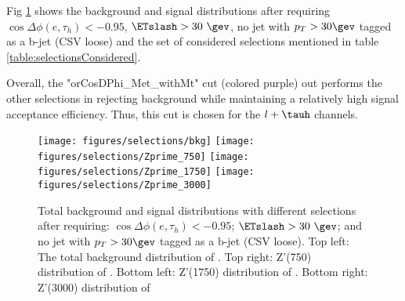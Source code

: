 Fig \ref{fig:selectionMotiviation2} shows the background and signal \meffmtau distributions 
after requiring $\cos{\Delta \phi (e,\tau_{h})}<-0.95$, $\ETslash>30~\gev$, no jet with 
$p_T>30\gev$ tagged as a b-jet (CSV loose) and the set of considered selections mentioned in 
table \ref{table:selectionsConsidered}. 

Overall, the "orCosDPhi\_Met\_withMt" cut (colored purple) out performs the other selections 
in rejecting background while maintaining a relatively high signal acceptance efficiency. 
Thus, this cut is chosen for the $l + \tauh$ channels.

\begin{figure}\centering
  \texttt{[image: figures/selections/bkg]}
  \texttt{[image: figures/selections/Zprime\_750]}
  \texttt{[image: figures/selections/Zprime\_1750]}
  \texttt{[image: figures/selections/Zprime\_3000]}
  \caption{\label{fig:selectionMotiviation2} Total background and signal 
distributions with different selections after requiring: $\cos{\Delta \phi (e,\tau_{h})}<-0.95$;
$\ETslash>30~\gev$; and no jet with $p_T>30\gev$ tagged as a b-jet (CSV loose). 
Top left: The total background distribution of \meffmtau. Top right: Z'(750) 
distribution of \meffmtau. Bottom left: Z'(1750) distribution of \meffmtau. 
Bottom right: Z'(3000) distribution of \meffmtau}
\end{figure}

